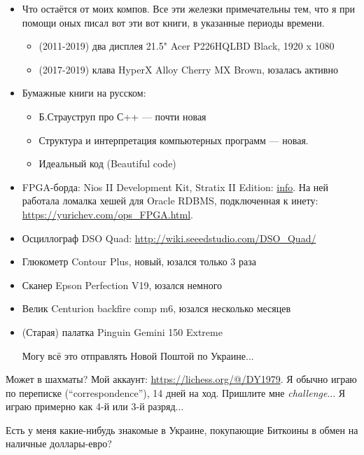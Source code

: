 \begin{itemize}
\item Что остаётся от моих компов. Все эти железки примечательны тем, что я при помощи оных писал вот эти вот книги, в указанные периоды времени.
	\begin{itemize}
	\item (2011-2019) два дисплея 21.5" Acer P226HQLBD Black, 1920 x 1080 
	\item (2017-2019) клава HyperX Alloy Cherry MX Brown, юзалась активно
	\end{itemize}

\item Бумажные книги на русском:
	\begin{itemize}
	\item Б.Страуструп про С++ --- почти новая
	\item Структура и интерпретация компьютерных программ --- новая.
	\item Идеальный код (Beautiful code)
	\end{itemize}

\item FPGA-борда: Nios II Development Kit, Stratix II Edition: \href{https://www.intel.com/content/www/us/en/programmable/products/boards_and_kits/dev-kits/altera/kit-niosii-2s60.html}{info}.
На ней работала ломалка хешей для Oracle RDBMS, подключенная к инету: \url{https://yurichev.com/ops_FPGA.html}.
\item Осциллограф DSO Quad: \url{http://wiki.seeedstudio.com/DSO_Quad/}
\item Глюкометр Contour Plus, новый, юзался только 3 раза
\item Сканер Epson Perfection V19, юзался немного
\item Велик Centurion backfire comp m6, юзался несколько месяцев

\item (Старая) палатка Pinguin Gemini 150 Extreme

Могу всё это отправлять Новой Поштой по Украине...

\end{itemize}

\myhrule{}

Может в шахматы?
Мой аккаунт: \url{https://lichess.org/@/DY1979}.
Я обычно играю по переписке (``correspondence''), 14 дней на ход.
Пришлите мне \textit{challenge}...
Я играю примерно как 4-й или 3-й разряд...

\myhrule{}

Есть у меня какие-нибудь знакомые в Украине, покупающие Биткоины в обмен на наличные доллары-евро?

